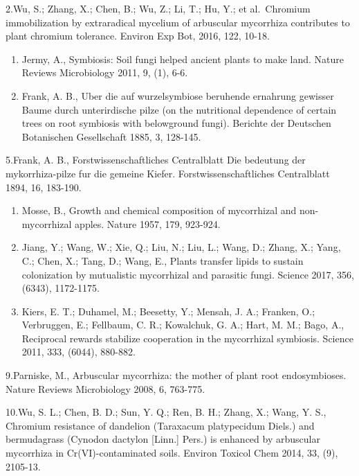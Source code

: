 \documentclass[
]{book}
\begin{document}
2.Wu, S.; Zhang, X.; Chen, B.; Wu, Z.; Li, T.; Hu, Y.; et al.~Chromium immobilization by extraradical mycelium of arbuscular mycorrhiza contributes to plant chromium tolerance. Environ Exp Bot, 2016, 122, 10-18.

\begin{enumerate}
\def\labelenumi{\arabic{enumi}.}
\setcounter{enumi}{2}
\item
  Jermy, A., Symbiosis: Soil fungi helped ancient plants to make land. Nature Reviews Microbiology 2011, 9, (1), 6-6.
\item
  Frank, A. B., Uber die auf wurzelsymbiose beruhende ernahrung gewisser Baume durch unterirdische pilze (on the nutritional dependence of certain trees on root symbiosis with belowground fungi). Berichte der Deutschen Botanischen Gesellschaft 1885, 3, 128-145.
\end{enumerate}

5.Frank, A. B., Forstwissenschaftliches Centralblatt Die bedeutung der mykorrhiza-pilze fur die gemeine Kiefer. Forstwissenschaftliches Centralblatt 1894, 16, 183-190.

\begin{enumerate}
\def\labelenumi{\arabic{enumi}.}
\setcounter{enumi}{5}
\item
  Mosse, B., Growth and chemical composition of mycorrhizal and non-mycorrhizal apples. Nature 1957, 179, 923-924.
\item
  Jiang, Y.; Wang, W.; Xie, Q.; Liu, N.; Liu, L.; Wang, D.; Zhang, X.; Yang, C.; Chen, X.; Tang, D.; Wang, E., Plants transfer lipids to sustain colonization by mutualistic mycorrhizal and parasitic fungi. Science 2017, 356, (6343), 1172-1175.
\item
  Kiers, E. T.; Duhamel, M.; Beesetty, Y.; Mensah, J. A.; Franken, O.; Verbruggen, E.; Fellbaum, C. R.; Kowalchuk, G. A.; Hart, M. M.; Bago, A., Reciprocal rewards stabilize cooperation in the mycorrhizal symbiosis. Science 2011, 333, (6044), 880-882.
\end{enumerate}

9.Parniske, M., Arbuscular mycorrhiza: the mother of plant root endosymbioses. Nature Reviews Microbiology 2008, 6, 763-775.

10.Wu, S. L.; Chen, B. D.; Sun, Y. Q.; Ren, B. H.; Zhang, X.; Wang, Y. S., Chromium resistance of dandelion (Taraxacum platypecidum Diels.) and bermudagrass (Cynodon dactylon {[}Linn.{]} Pers.) is enhanced by arbuscular mycorrhiza in Cr(VI)-contaminated soils. Environ Toxicol Chem 2014, 33, (9), 2105-13.
\end{document}
